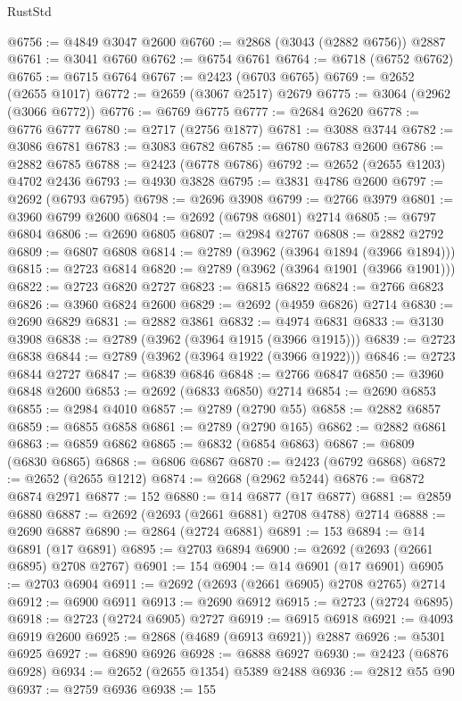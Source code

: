 \begin{lexlean}{RustStd}
\begin{coremodule}
@6756 := @4849 @3047 @2600
@6760 := @2868 (@3043 (@2882 @6756)) @2887
@6761 := @3041 @6760
@6762 := @6754 @6761
@6764 := @6718 (@6752 @6762)
@6765 := @6715 @6764
@6767 := @2423 (@6703 @6765)
@6769 := @2652 (@2655 @1017)
@6772 := @2659 (@3067 @2517) @2679
@6775 := @3064 (@2962 (@3066 @6772))
@6776 := @6769 @6775
@6777 := @2684 @2620
@6778 := @6776 @6777
@6780 := @2717 (@2756 @1877)
@6781 := @3088 @3744
@6782 := @3086 @6781
@6783 := @3083 @6782
@6785 := @6780 @6783 @2600
@6786 := @2882 @6785
@6788 := @2423 (@6778 @6786)
@6792 := @2652 (@2655 @1203) @4702 @2436
@6793 := @4930 @3828
@6795 := @3831 @4786 @2600
@6797 := @2692 (@6793 @6795)
@6798 := @2696 @3908
@6799 := @2766 @3979
@6801 := @3960 @6799 @2600
@6804 := @2692 (@6798 @6801) @2714
@6805 := @6797 @6804
@6806 := @2690 @6805
@6807 := @2984 @2767
@6808 := @2882 @2792
@6809 := @6807 @6808
@6814 := @2789 (@3962 (@3964 @1894 (@3966 @1894)))
@6815 := @2723 @6814
@6820 := @2789 (@3962 (@3964 @1901 (@3966 @1901)))
@6822 := @2723 @6820 @2727
@6823 := @6815 @6822
@6824 := @2766 @6823
@6826 := @3960 @6824 @2600
@6829 := @2692 (@4959 @6826) @2714
@6830 := @2690 @6829
@6831 := @2882 @3861
@6832 := @4974 @6831
@6833 := @3130 @3908
@6838 := @2789 (@3962 (@3964 @1915 (@3966 @1915)))
@6839 := @2723 @6838
@6844 := @2789 (@3962 (@3964 @1922 (@3966 @1922)))
@6846 := @2723 @6844 @2727
@6847 := @6839 @6846
@6848 := @2766 @6847
@6850 := @3960 @6848 @2600
@6853 := @2692 (@6833 @6850) @2714
@6854 := @2690 @6853
@6855 := @2984 @4010
@6857 := @2789 (@2790 @55)
@6858 := @2882 @6857
@6859 := @6855 @6858
@6861 := @2789 (@2790 @165)
@6862 := @2882 @6861
@6863 := @6859 @6862
@6865 := @6832 (@6854 @6863)
@6867 := @6809 (@6830 @6865)
@6868 := @6806 @6867
@6870 := @2423 (@6792 @6868)
@6872 := @2652 (@2655 @1212)
@6874 := @2668 (@2962 @5244)
@6876 := @6872 @6874 @2971
@6877 := 152
@6880 := @14 @6877 (@17 @6877)
@6881 := @2859 @6880
@6887 := @2692 (@2693 (@2661 @6881) @2708 @4788) @2714
@6888 := @2690 @6887
@6890 := @2864 (@2724 @6881)
@6891 := 153
@6894 := @14 @6891 (@17 @6891)
@6895 := @2703 @6894
@6900 := @2692 (@2693 (@2661 @6895) @2708 @2767)
@6901 := 154
@6904 := @14 @6901 (@17 @6901)
@6905 := @2703 @6904
@6911 := @2692 (@2693 (@2661 @6905) @2708 @2765) @2714
@6912 := @6900 @6911
@6913 := @2690 @6912
@6915 := @2723 (@2724 @6895)
@6918 := @2723 (@2724 @6905) @2727
@6919 := @6915 @6918
@6921 := @4093 @6919 @2600
@6925 := @2868 (@4689 (@6913 @6921)) @2887
@6926 := @5301 @6925
@6927 := @6890 @6926
@6928 := @6888 @6927
@6930 := @2423 (@6876 @6928)
@6934 := @2652 (@2655 @1354) @5389 @2488
@6936 := @2812 @55 @90
@6937 := @2759 @6936
@6938 := 155

\end{coremodule}
\end{lexlean}
